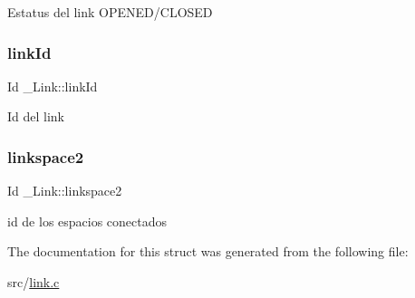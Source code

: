 Estatus del link O\+P\+E\+N\+E\+D/\+C\+L\+O\+S\+ED \mbox{\label{struct__Link_a3c2eb94d5f272bf373c113a868e3d367}} 
\subsubsection{\texorpdfstring{link\+Id}{linkId}}
{\footnotesize\ttfamily Id \+\_\+\+Link\+::link\+Id}

Id del link \mbox{\label{struct__Link_aac79e76abc5512cd08a381eb835d59f0}} 
\subsubsection{\texorpdfstring{linkspace2}{linkspace2}}
{\footnotesize\ttfamily Id \+\_\+\+Link\+::linkspace2}

id de los espacios conectados 

The documentation for this struct was generated from the following file\+:\begin{DoxyCompactItemize}
\item 
src/\hyperlink{link_8c}{link.\+c}\end{DoxyCompactItemize}
